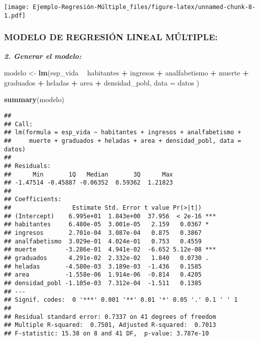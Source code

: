 \documentclass[]{article}
\newenvironment{Shaded}{\begin{snugshade}}{\end{snugshade}}
\newcommand{\KeywordTok}[1]{\textcolor[rgb]{0.13,0.29,0.53}{\textbf{#1}}}
\newcommand{\DataTypeTok}[1]{\textcolor[rgb]{0.13,0.29,0.53}{#1}}
\newcommand{\StringTok}[1]{\textcolor[rgb]{0.31,0.60,0.02}{#1}}
\newcommand{\OperatorTok}[1]{\textcolor[rgb]{0.81,0.36,0.00}{\textbf{#1}}}
\newcommand{\NormalTok}[1]{#1}
\begin{document}
\texttt{[image: Ejemplo-Regresión-Múltiple\_files/figure-latex/unnamed-chunk-8-1.pdf]}

\subsubsection{MODELO DE REGRESIÓN LINEAL
MÚLTIPLE:}\label{modelo-de-regresiuxf3n-lineal-muxfaltiple}

\emph{\textbf{2. Generar el modelo:}}

\begin{Shaded}
\begin{Highlighting}[]
\NormalTok{modelo <-}\StringTok{ }\KeywordTok{lm}\NormalTok{(esp_vida }\OperatorTok{~}\StringTok{ }\NormalTok{habitantes }\OperatorTok{+}\StringTok{ }\NormalTok{ingresos }\OperatorTok{+}\StringTok{ }\NormalTok{analfabetismo }\OperatorTok{+}\StringTok{ }\NormalTok{muerte }\OperatorTok{+}\StringTok{ }\NormalTok{graduados }\OperatorTok{+}\StringTok{ }\NormalTok{heladas }\OperatorTok{+}\StringTok{ }\NormalTok{area }\OperatorTok{+}\StringTok{ }\NormalTok{densidad_pobl, }\DataTypeTok{data =}\NormalTok{ datos )}

\KeywordTok{summary}\NormalTok{(modelo)}
\end{Highlighting}
\end{Shaded}

\begin{verbatim}
## 
## Call:
## lm(formula = esp_vida ~ habitantes + ingresos + analfabetismo + 
##     muerte + graduados + heladas + area + densidad_pobl, data = datos)
## 
## Residuals:
##      Min       1Q   Median       3Q      Max 
## -1.47514 -0.45887 -0.06352  0.59362  1.21823 
## 
## Coefficients:
##                 Estimate Std. Error t value Pr(>|t|)    
## (Intercept)    6.995e+01  1.843e+00  37.956  < 2e-16 ***
## habitantes     6.480e-05  3.001e-05   2.159   0.0367 *  
## ingresos       2.701e-04  3.087e-04   0.875   0.3867    
## analfabetismo  3.029e-01  4.024e-01   0.753   0.4559    
## muerte        -3.286e-01  4.941e-02  -6.652 5.12e-08 ***
## graduados      4.291e-02  2.332e-02   1.840   0.0730 .  
## heladas       -4.580e-03  3.189e-03  -1.436   0.1585    
## area          -1.558e-06  1.914e-06  -0.814   0.4205    
## densidad_pobl -1.105e-03  7.312e-04  -1.511   0.1385    
## ---
## Signif. codes:  0 '***' 0.001 '**' 0.01 '*' 0.05 '.' 0.1 ' ' 1
## 
## Residual standard error: 0.7337 on 41 degrees of freedom
## Multiple R-squared:  0.7501, Adjusted R-squared:  0.7013 
## F-statistic: 15.38 on 8 and 41 DF,  p-value: 3.787e-10
\end{verbatim}
\end{document}
